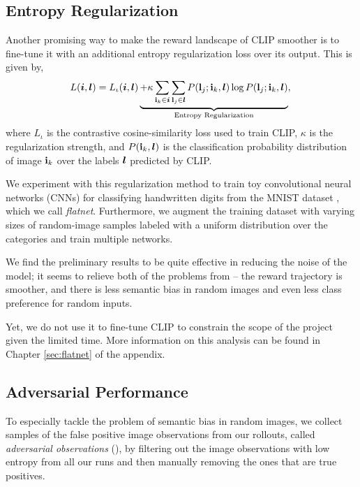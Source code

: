 
\subsection{Entropy Regularization}
\label{sec:entropy-regularization}
Another promising way to make the reward landscape of CLIP smoother is to fine-tune it with an additional entropy regularization loss over its output.
This is given by,
\begin{equation}
    \label{eq:entropy-regularization}
    L(\bm{i}, \bm{l}) = L_{\iota}(\bm{i}, \bm{l}) \underbrace{+ \kappa \sum_{\mathbf{i}_k \in \bm{i}}\sum_{\mathbf{l}_j \in \bm{l}} P(\mathbf{l}_j; \mathbf{i}_k, \bm{l}) \log P(\mathbf{l}_j; \mathbf{i}_k, \bm{l})}_{\text{Entropy Regularization}},\\
\end{equation}
where \(L_{\iota}\) is the contrastive cosine-similarity loss used to train CLIP, $\kappa$ is the regularization strength, and \(P(\mathbf{i}_k, \bm{l})\) is the classification probability distribution of image \(\mathbf{i}_k\) over the labels \(\bm{l}\) predicted by CLIP.

We experiment with this regularization method to train toy convolutional neural networks (CNNs) for classifying handwritten digits from the MNIST dataset \citep{mnist}, which we call \emph{flatnet}.
Furthermore, we augment the training dataset with varying sizes of random-image samples labeled with a uniform distribution over the categories and train multiple networks.

We find the preliminary results to be quite effective in reducing the noise of the model; it seems to relieve both of the problems from  -- the reward trajectory is smoother, and there is less semantic bias in random images and even less class preference for random inputs.

Yet, we do not use it to fine-tune CLIP to constrain the scope of the project given the limited time.
More information on this analysis can be found in Chapter \ref{sec:flatnet} of the appendix.

\subsection{Adversarial Performance}
\label{sec:adversarial-performance}
To especially tackle the problem of semantic bias in random images, we collect samples of the false positive image observations from our rollouts, called \emph{adversarial observations} (), by filtering out the image observations with low entropy from all our runs and then manually removing the ones that are true positives.

